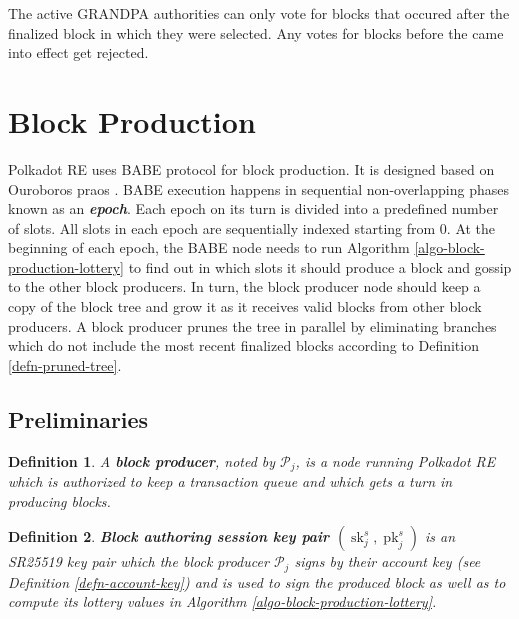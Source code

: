 \documentclass{book}
\newcommand{\tmem}[1]{{\em #1\/}}
\newcommand{\tmop}[1]{\ensuremath{\operatorname{#1}}}
\newcommand{\tmstrong}[1]{\textbf{#1}}
\newcommand{\tmtextbf}[1]{{\bfseries{#1}}}
\newcommand{\tmtextit}[1]{{\itshape{#1}}}
\newcommand{\tmtexttt}[1]{{\ttfamily{#1}}}
\newcommand{\tmverbatim}[1]{{\ttfamily{#1}}}
\newtheorem{definition}{Definition}
\providecommand{\tmem}[1]{\tmtextit{#1}}
\providecommand{\tmop}[1]{\ensuremath{\mathrm{#1}}}
\providecommand{\tmstrong}[1]{\tmtextbf{#1}}
\providecommand{\tmtextbf}[1]{\tmtextbf{#1}}
\providecommand{\tmtextit}[1]{\tmtextit{#1}}
\providecommand{\tmverbatim}[1]{\tmtexttt{#1}}
\newtheorem{definition}{Definition}
\begin{document}
The active GRANDPA authorities can only vote for blocks that occured after the
finalized block in which they were selected. Any votes for blocks before the
\tmverbatim{Scheduled Change} came into effect get rejected.

\section{Block Production}\label{sect-babe}\label{sect-block-production}

Polkadot RE uses BABE protocol {\cite{w3f_research_group_blind_2019}} for
block production. It is designed based on Ouroboros praos
{\cite{david_ouroboros_2018}}. BABE execution happens in sequential
non-overlapping phases known as an {\tmstrong{{\tmem{epoch}}}}. Each epoch on
its turn is divided into a predefined number of slots. All slots in each epoch
are sequentially indexed starting from 0. At the beginning of each epoch, the
BABE node needs to run Algorithm \ref{algo-block-production-lottery} to find
out in which slots it should produce a block and gossip to the other block
producers. In turn, the block producer node should keep a copy of the block
tree and grow it as it receives valid blocks from other block producers. A
block producer prunes the tree in parallel by eliminating branches which do
not include the most recent finalized blocks according to Definition
\ref{defn-pruned-tree}.

\subsection{Preliminaries}

\begin{definition}
  A {\tmstrong{block producer}}, noted by $\mathcal{P}_j$, is a node running
  Polkadot RE which is authorized to keep a transaction queue and which gets a
  turn in producing blocks.
\end{definition}

\begin{definition}
  {\tmstrong{Block authoring session key pair $(\tmop{sk}^s_j,
  \tmop{pk}^s_j)$}} is an SR25519 key pair which the block producer
  $\mathcal{P}_j$ signs by their account key (see Definition
  \ref{defn-account-key}) and is used to sign the produced block as well as to
  compute its lottery values in Algorithm \ref{algo-block-production-lottery}.
  
\end{definition}
\end{document}
